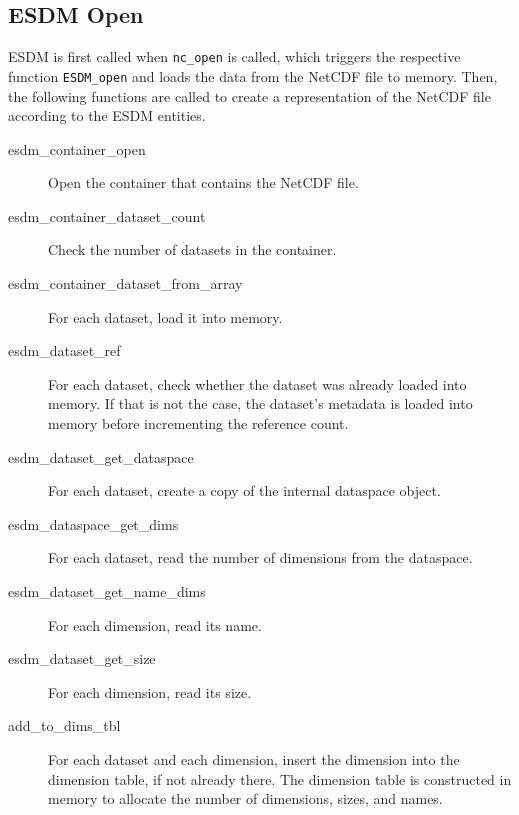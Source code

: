 \subsection{ESDM Open}

ESDM is first called when \texttt{nc\_open} is called, which triggers the respective function \texttt{ESDM\_open} and loads the data from the NetCDF file to memory.
Then, the following functions are called to create a representation of the NetCDF file according to the ESDM entities.

\begin{description}

\item[esdm\_container\_open]

Open the container that contains the NetCDF file.

\item[esdm\_container\_dataset\_count]

Check the number of datasets in the container.

\item[esdm\_container\_dataset\_from\_array]

For each dataset, load it into memory.

\item[esdm\_dataset\_ref]

For each dataset, check whether the dataset was already loaded into memory.
If that is not the case, the dataset's metadata is loaded into memory before incrementing the reference count.

\item[esdm\_dataset\_get\_dataspace]

For each dataset, create a copy of the internal dataspace object.

\item[esdm\_dataspace\_get\_dims]

For each dataset, read the number of dimensions from the dataspace.

\item[esdm\_dataset\_get\_name\_dims]

For each dimension, read its name.

\item[esdm\_dataset\_get\_size]

For each dimension, read its size.

\item[add\_to\_dims\_tbl]

For each dataset and each dimension, insert the dimension into the dimension table, if not already there.
The dimension table is constructed in memory to allocate the number of dimensions, sizes, and names.


\end{description}
